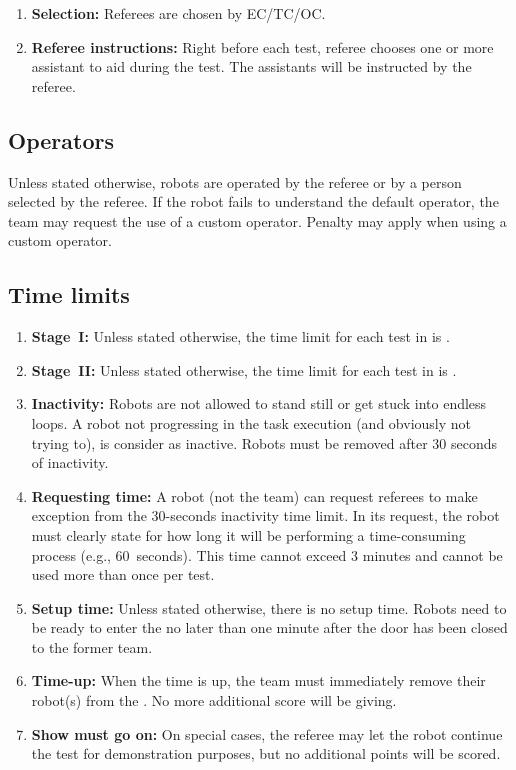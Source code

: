 \begin{enumerate}
	\item \textbf{Selection:} Referees are chosen by EC/TC/OC.

	\item \textbf{Referee instructions:} Right before each test, referee chooses one or more assistant to aid during the test. The assistants will be instructed by the referee.
\end{enumerate}


\subsection{Operators}
\label{rule:operator}
Unless stated otherwise, robots are operated by the referee or by a person selected by the referee.
If the robot fails to understand the default operator, the team may request the use of a custom operator.
Penalty may apply when using a custom operator.


\subsection{Time limits}
\label{rule:time_limits}
\begin{enumerate}
	\item \textbf{Stage~I:} Unless stated otherwise, the time limit for each test in  is .

	\item \textbf{Stage~II:} Unless stated otherwise, the time limit for each test in  is .

	\item \textbf{Inactivity:} Robots are not allowed to stand still or get stuck into endless loops.
	A robot not progressing in the task execution (and obviously not trying to), is consider as inactive.
	Robots must be removed after 30 seconds of inactivity.

	\item \textbf{Requesting time:} A robot (not the team) can request referees to make exception from the 30-seconds inactivity time limit.
	In its request, the robot must clearly state for how long it will be performing a time-consuming process (e.g., 60~seconds).
	This time cannot exceed 3 minutes and cannot be used more than once per test.

	\item \textbf{Setup time:} Unless stated otherwise, there is no setup time.
	Robots need to be ready to enter the \Arena{} no later than one minute after the door has been closed to the former team.

	\item \textbf{Time-up:} When the time is up, the team must immediately remove their robot(s) from the  \Arena{}.
	No more additional score will be giving.

	\item \textbf{Show must go on:} On special cases, the referee may let the robot continue the test for demonstration purposes, but no additional points will be scored.
\end{enumerate}

